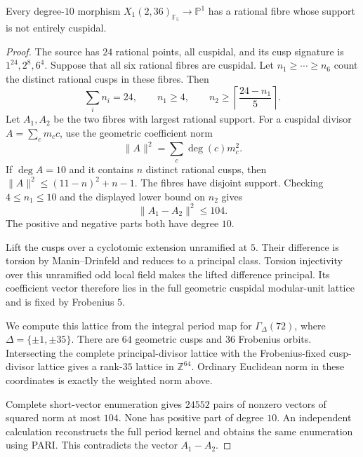 \begin{lemma}\label{lem:decic236-cuspidal-pencil}
Every degree-$10$ morphism
$X_1(2,36)_{\mathbb F_5}\to\mathbb P^1$
has a rational fibre whose support is not entirely cuspidal.
\end{lemma}
\begin{proof}
The source has $24$ rational points, all cuspidal, and its cusp
signature is $1^{24},2^8,6^4$. Suppose that all six rational
fibres are cuspidal. Let $n_1\geq\cdots\geq n_6$ count the
distinct rational cusps in these fibres. Then
\[
 \sum_i n_i=24,\qquad n_1\geq4,\qquad
 n_2\geq\left\lceil\frac{24-n_1}{5}\right\rceil.
\]
Let $A_1,A_2$ be the two fibres with largest rational support.
For a cuspidal divisor $A=\sum_c m_c c$, use the geometric
coefficient norm
\[
 \|A\|^2=\sum_c \deg(c)m_c^2.
\]
If $\deg A=10$ and it contains $n$ distinct rational cusps,
then $\|A\|^2\leq(11-n)^2+n-1$.
The fibres have disjoint support. Checking $4\leq n_1\leq10$
and the displayed lower bound on $n_2$ gives
\[
 \|A_1-A_2\|^2\leq104.
\]
The positive and negative parts both have degree $10$.

Lift the cusps over a cyclotomic extension unramified at $5$.
Their difference is torsion by Manin--Drinfeld and reduces to a
principal class. Torsion injectivity over this unramified odd local
field makes the lifted difference principal. Its coefficient vector
therefore lies in the full geometric cuspidal modular-unit lattice
and is fixed by Frobenius $5$.

We compute this lattice from the integral period map for
$\Gamma_\Delta(72)$, where $\Delta=\{\pm1,\pm35\}$.
There are $64$ geometric cusps and $36$ Frobenius orbits.
Intersecting the complete principal-divisor lattice with the
Frobenius-fixed cusp-divisor lattice gives a rank-$35$ lattice
in $\mathbb Z^{64}$. Ordinary Euclidean norm in these coordinates
is exactly the weighted norm above.

Complete short-vector enumeration gives $24552$ pairs of nonzero
vectors of squared norm at most $104$. None has positive part of
degree $10$. An independent calculation reconstructs the full
period kernel and obtains the same enumeration using PARI.
This contradicts the vector $A_1-A_2$.
\end{proof}
